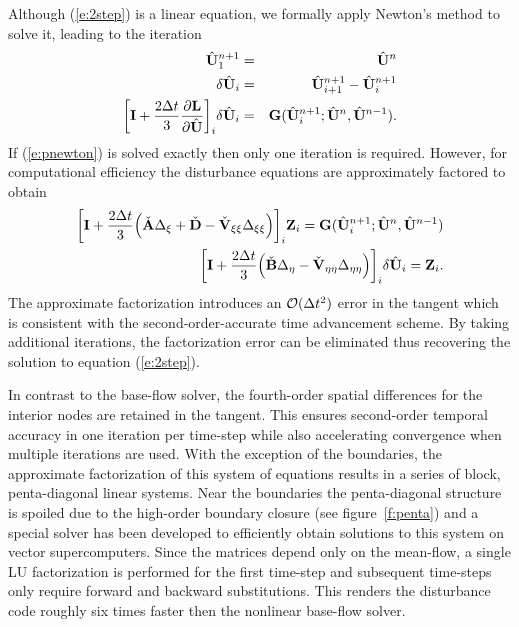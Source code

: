 %
Although (\ref{e:2step}) is a linear equation, we formally apply Newton's
method to solve it, leading to the iteration
%
\begin{eqnarray}
  {\hat{\bf U}}^{n+1}_1 &=& {\hat{\bf U}}^{n} \\
  \delta {\hat{\bf U}}_{i} &=& {\hat{\bf U}}^{n+1}_{i+1} - {\hat{\bf U}}^{n+1}_{i} \\
  \bigg[ {\bf I} + \frac{2\Delta t}{3} \frac{\partial {\bf L}}{\partial {\hat{\bf U}}} 
  \bigg]_{i} \delta {\hat{\bf U}}_{i} &=& {\bf G}({\hat{\bf U}}^{n+1}_{i};{\hat{\bf U}}^{n},{\hat{\bf U}}^{n-1})  .
  \label{e:pnewton}
\end{eqnarray}
%
If (\ref{e:pnewton}) is solved exactly then only one iteration is required.
However, for computational efficiency the disturbance equations are
approximately factored to obtain
%
\begin{eqnarray}
  \bigg[ {\bf I} + \frac{2\Delta t}{3} \Big ( \check{{\bf A}} \Delta_{\xi} + 
                               \check{{\bf D}} - 
                               \check{\bf V}_{\xi\xi} \Delta_{\xi\xi} 
  \Big) \bigg]_{i} {\bf Z}_{i} = 
  {\bf G}({\hat{\bf U}}^{n+1}_{i};{\hat{\bf U}}^{n},{\hat{\bf U}}^{n-1}) \label{e:itera} \\
  \bigg[ {\bf I} + \frac{2\Delta t}{3} \Big ( \check{{\bf B}} \Delta_{\eta} - 
                               \check{\bf V}_{\eta\eta} \Delta_{\eta\eta}
  \Big) \bigg]_{i} \delta {\hat{\bf U}}_{i} = {\bf Z}_{i} . \label{e:iterb}
\end{eqnarray}
%
The approximate factorization introduces an ${\cal O}(\Delta t^2)$ error in
the tangent which is consistent with the second-order-accurate time
advancement scheme. By taking additional iterations, the factorization error
can be eliminated thus recovering the solution to equation (\ref{e:2step}).

In contrast to the base-flow solver, the fourth-order spatial differences for
the interior nodes are retained in the tangent.  This ensures second-order
temporal accuracy in one iteration per time-step while also accelerating
convergence when multiple iterations are used.  With the exception of the
boundaries, the approximate factorization of this system of equations results
in a series of block, penta-diagonal linear systems.  Near the boundaries the
penta-diagonal structure is spoiled due to the high-order boundary closure
(see figure~\ref{f:penta}) and a special solver has been developed to
efficiently obtain solutions to this system on vector supercomputers.  Since
the matrices depend only on the mean-flow, a single LU factorization is
performed for the first time-step and subsequent time-steps only require
forward and backward substitutions.  This renders the disturbance code roughly
six times faster then the nonlinear base-flow solver.

